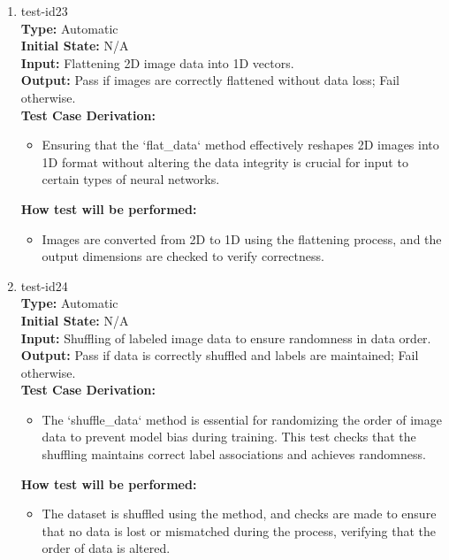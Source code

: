 \documentclass[12pt, titlepage]{article}
\begin{document}
\begin{enumerate}
\item{test-id23\\}
\textbf{Type:} Automatic\\
\textbf{Initial State:} N/A\\
\textbf{Input:} Flattening 2D image data into 1D vectors.\\
\textbf{Output:} Pass if images are correctly flattened without 
data loss; Fail otherwise.\\
\textbf{Test Case Derivation:}
\begin{itemize}
    \item Ensuring that the `flat\_data` method effectively reshapes 
    2D images into 1D format without altering the data integrity is crucial 
    for input to certain types of neural networks.
\end{itemize}
\textbf{How test will be performed:}
\begin{itemize}
  \item Images are converted from 2D to 1D using the flattening process, 
  and the output dimensions are checked to verify correctness.
\end{itemize}

\item{test-id24\\}
\textbf{Type:} Automatic\\
\textbf{Initial State:} N/A\\
\textbf{Input:} Shuffling of labeled image data to ensure randomness in data order.\\
\textbf{Output:} Pass if data is correctly shuffled and labels are maintained; Fail otherwise.\\
\textbf{Test Case Derivation:}
\begin{itemize}
  \item The `shuffle\_data` method is essential for randomizing the order of image 
  data to prevent model bias during training. This test checks that the shuffling maintains correct 
  label associations and achieves randomness.
\end{itemize}
\textbf{How test will be performed:}
\begin{itemize}
  \item The dataset is shuffled using the method, and checks are made to ensure 
  that no data is lost or mismatched during the process, verifying that the order of data is altered.
\end{itemize}


\end{enumerate}
\end{document}
